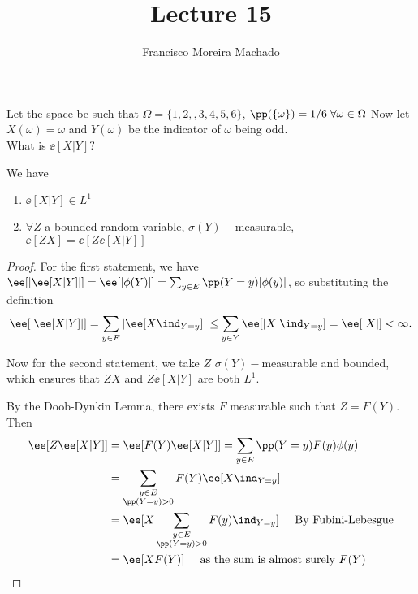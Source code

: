 \documentclass[../main.tex]{subfiles}
\author{Francisco Moreira Machado}
\title{Lecture 15}
\begin{document}
\begin{example}
  Let the space be such that
    $\Omega = \{ 1,2,,3,4,5,6 \} $, $\pp(\{ \omega \} ) = 1/6 \;\forall \omega \in \Omega$
  Now let $X(\omega) = \omega$ and $Y(\omega)$ be the indicator of $\omega$ being odd.
  \\
  What is $\ee[X | Y]?$
\end{example}

\begin{lemma}
    We have
    \begin{enumerate}
      \item $\ee[X | Y] \in L^1$
      \item $\forall Z$ a bounded random variable, $\sigma(Y)-$measurable, 
        $\ee[ZX] = \ee[Z\ee[X | Y]]$
    \end{enumerate}
\end{lemma}
\begin{proof}
  For the first statement, we have $\ee[ |\ee[X | Y] |] = \ee[|\phi(Y)|] =
  \sum_{y \in E} \pp(Y = y) |\phi(y)|$, so substituting the definition 
  \[
    \ee[|\ee[X | Y]|] = \sum_{y \in E} |\ee[X \ind_{Y = y}]| \leq \sum_{y \in
    Y} \ee[|X| \ind_{Y = y}] = \ee[|X|] < \infty
  .\] 

  \vspace{0.5em}\noindent
  Now for the second statement, we take $Z$ $\sigma(Y)-$measurable and
  bounded, which ensures that $ZX$ and $Z\ee[X | Y]$ are both $L^1$. 

  By the Doob-Dynkin Lemma, there exists $F$ measurable such that 
  $Z = F(Y)$. Then 
  \begin{align*}
    \ee[Z \ee[X | Y]] &= \ee[F(Y) \ee[X | Y]] = \sum_{y \in E}
    \pp(Y = y) F(y) \phi(y)  \\
    &= \sum_{\substack{y \in E \\ \pp(Y = y) > 0}} F(Y) \ee[X \ind_{Y = y}] \\
    &= \ee [ X \sum_{\substack{y \in E \\ \pp(Y = y) > 0}} F(y) \ind_{Y =
    y} ] \;\;\;\;\;\text{By Fubini-Lebesgue} \\
    &= \ee[X F(Y)] \;\;\;\;\;\text{as the sum is almost surely $F(Y)$}
  \end{align*}
\end{proof}
\end{document}
